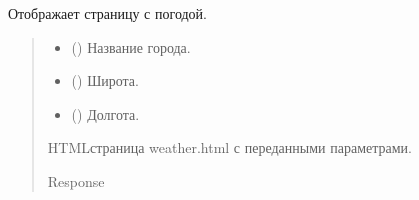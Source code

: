 \documentclass[letterpaper,10pt,russian]{sphinxmanual}
\begin{document}

\begin{fulllineitems}
\label{\detokenize{Project_weather:app.weather.controller.weather_page}}
\pysigstartsignatures
\pysiglinewithargsret
{}
{}
{}
\pysigstopsignatures
\sphinxAtStartPar
Отображает страницу с погодой.
\begin{quote}\begin{description}
\begin{itemize}
\item {} 
\sphinxAtStartPar
{} (\sphinxstyleliteralemphasis{\sphinxupquote{, }}) \textendash{} Название города.

\item {} 
\sphinxAtStartPar
{} (\sphinxstyleliteralemphasis{\sphinxupquote{, }}) \textendash{} Широта.

\item {} 
\sphinxAtStartPar
{} (\sphinxstyleliteralemphasis{\sphinxupquote{, }}) \textendash{} Долгота.

\end{itemize}

\sphinxAtStartPar
HTML\sphinxhyphen{}страница weather.html с переданными параметрами.

\sphinxAtStartPar
Response

\end{description}\end{quote}

\end{fulllineitems}
\end{document}
